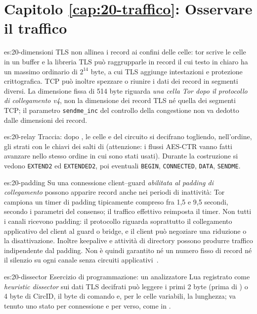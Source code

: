 \section*{Capitolo \ref{cap:20-traffico}: Osservare il traffico}

\begin{soluzione}{es:20-dimensioni}
TLS non allinea i record ai confini delle celle: tor scrive le celle in un buffer e la libreria TLS può raggrupparle in record il cui testo in chiaro ha un massimo ordinario di $2^{14}$ byte, a cui TLS aggiunge intestazioni e protezione crittografica. TCP può inoltre spezzare o riunire i dati dei record in segmenti diversi. La dimensione fissa di 514 byte riguarda \emph{una cella Tor dopo il protocollo di collegamento v4}, non la dimensione dei record TLS né quella dei segmenti TCP; il parametro \texttt{sendme\_inc} del controllo della congestione non va dedotto dalle dimensioni dei record.
\end{soluzione}

\begin{soluzione}{es:20-relay}
Traccia: dopo , le celle  e  del circuito si decifrano togliendo, nell'ordine, gli strati con le chiavi dei salti di  (attenzione: i flussi AES-CTR vanno fatti avanzare nello stesso ordine in cui sono stati usati). Durante la costruzione si vedono \texttt{EXTEND2} ed \texttt{EXTENDED2}, poi eventuali \texttt{BEGIN}, \texttt{CONNECTED}, \texttt{DATA}, \texttt{SENDME}.
\end{soluzione}

\begin{soluzione}{es:20-padding}
Su una connessione client--guard \emph{abilitata al padding di collegamento} possono apparire record anche nei periodi di inattività: Tor campiona un timer di padding tipicamente compreso fra 1,5 e 9,5 secondi, secondo i parametri del consenso; il traffico effettivo reimposta il timer. Non tutti i canali ricevono padding: il protocollo riguarda soprattutto il collegamento applicativo del client al guard o bridge, e il client può negoziare una riduzione o la disattivazione. Inoltre keepalive e attività di directory possono produrre traffico indipendente dal padding. Non è quindi garantito né un numero fisso di record né il silenzio su ogni canale senza circuiti applicativi~.
\end{soluzione}

\begin{soluzione}{es:20-dissector}
Esercizio di programmazione: un analizzatore Lua registrato come \emph{heuristic dissector} sui dati TLS decifrati può leggere i primi 2 byte (prima di ) o 4 byte di CircID, il byte di comando e, per le celle variabili, la lunghezza; va tenuto uno stato per connessione e per verso, come in .
\end{soluzione}


